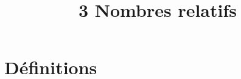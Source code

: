 \documentclass[12pt,a4paper]{article}
\date{}
\title{\textcircled{{\normalsize{3}}} Nombres relatifs}
\begin{document}
	
	\maketitle



\section{Définitions}



%
%
% 
%
%
%
%
%
%
\end{document}

